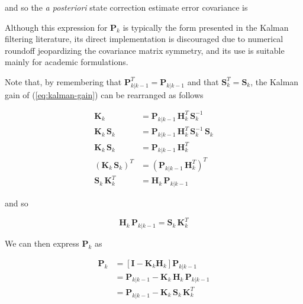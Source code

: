\documentclass[12pt]{article}
\begin{document}
and so the \textit{a posteriori} state correction estimate error covariance is


Although this expression for $\mathbf{P}_k$ is typically the form presented in the Kalman
filtering literature, its direct implementation is discouraged due to numerical roundoff
jeopardizing the covariance matrix symmetry, and its use is suitable mainly for academic formulations.

Note that, by remembering that $\mathbf{P}_{k|k-1}^T = \mathbf{P}_{k|k-1}$ and that 
$\mathbf{S}_k^T = \mathbf{S}_k$, the Kalman gain of (\ref{eq:kalman-gain}) can be
rearranged as follows

\begin{equation*}
    \begin{aligned}
        \mathbf{K}_{k} &= \mathbf{P}_{k|k-1} \, \mathbf{H}_{k}^T \, \mathbf{S}_{k}^{-1} \\
        \mathbf{K}_{k} \, \mathbf{S}_{k} &= \mathbf{P}_{k|k-1} \, \mathbf{H}_{k}^T \, \mathbf{S}_{k}^{-1} \, \mathbf{S}_{k} \\
        \mathbf{K}_{k} \, \mathbf{S}_{k} &= \mathbf{P}_{k|k-1} \, \mathbf{H}_{k}^T\\
        \left( \mathbf{K}_{k} \, \mathbf{S}_{k} \right)^T &= \left( \mathbf{P}_{k|k-1} \, \mathbf{H}_{k}^T \right)^T \\
        \mathbf{S}_{k} \, \mathbf{K}_{k}^T &= \mathbf{H}_{k} \,\mathbf{P}_{k|k-1}
    \end{aligned}
\end{equation*}

and so

\begin{equation*}
    \mathbf{H}_{k} \,\mathbf{P}_{k|k-1} = \mathbf{S}_{k} \, \mathbf{K}_{k}^T
\end{equation*}

We can then express $\mathbf{P}_k$ as

\begin{equation*}
    \begin{aligned}
    \mathbf{P}_{k} &= \left[ \mathbf{I} - \mathbf{K}_k \mathbf{H}_k \right] \mathbf{P}_{k|k-1} \\
    &= \mathbf{P}_{k|k-1} - \mathbf{K}_{k} \, \mathbf{H}_{k} \, \mathbf{P}_{k|k-1} \\
    &= \mathbf{P}_{k|k-1} - \mathbf{K}_{k} \, \mathbf{S}_{k} \, \mathbf{K}_{k}^T
    \end{aligned}
\end{equation*}
\end{document}
